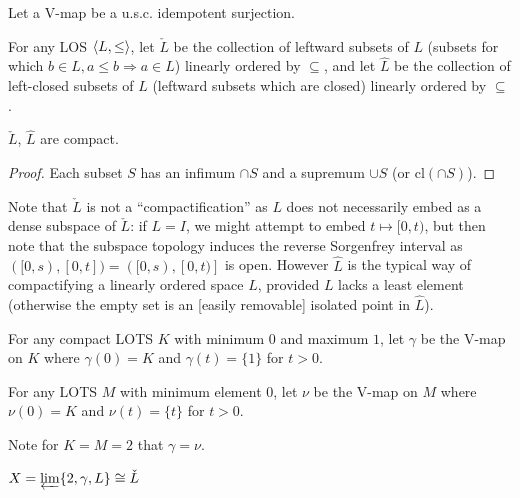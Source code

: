 \documentclass[11pt]{article}
\renewcommand{\cl}{\textrm{cl}}
\begin{document}
  \begin{definition}
    Let a V-map be a u.s.c. idempotent surjection.
  \end{definition}

  \begin{definition}
    For any LOS \(\langle L,\leq\rangle\), let \(\check L\) be the collection of
    leftward subsets of \(L\)
    (subsets for which \(b\in L,a\leq b\Rightarrow a\in L\))
    linearly ordered by \(\subseteq\), and let \(\hat L\) be the collection
    of left-closed subsets of \(L\) (leftward subsets which are closed)
    linearly ordered by \(\subseteq\).
  \end{definition}

  \begin{proposition}
    \(\check L\), \(\hat L\) are compact.
  \end{proposition}

  \begin{proof}
    Each subset \(S\) has an infimum \(\cap S\) and a supremum \(\cup S\)
    (or \(\cl(\cap S)\)).
  \end{proof}

  Note that \(\check L\)
  is not a ``compactification'' as \(L\) does not necessarily
  embed as a dense subspace of \(\check L\): if \(L=I\), we might attempt to embed
  \(t\mapsto [0,t)\), but then note that the subspace topology induces the
  reverse Sorgenfrey interval as \(([0,s),[0,t])=([0,s),[0,t)]\) is open.
  However \(\hat L\) is
  the typical way of compactifying a linearly ordered space \(L\),
  provided \(L\) lacks a least element (otherwise the empty set is an [easily
  removable] isolated point in \(\hat L\)).

  \begin{definition}
    For any compact LOTS \(K\) with minimum \(0\) and maximum \(1\),
    let \(\gamma\) be the V-map on \(K\) where \(\gamma(0)=K\) and \(\gamma(t)=\{1\}\)
    for \(t>0\).
  \end{definition}

  \begin{definition}
    For any LOTS \(M\) with minimum element \(0\),
    let \(\nu\) be the V-map on \(M\) where \(\nu(0)=K\) and \(\nu(t)=\{t\}\)
    for \(t>0\).
  \end{definition}

  Note for \(K=M=2\) that \(\gamma=\nu\).

  \begin{theorem}
    \(X=\varprojlim \{2, \gamma, L\}\cong \check L\)
  \end{theorem}
\end{document}
